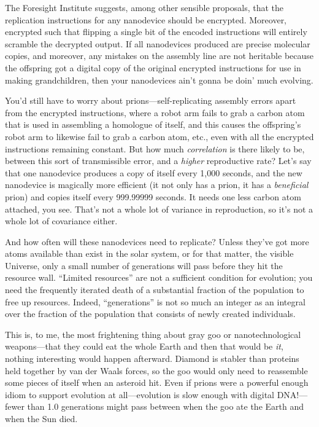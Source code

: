  The Foresight Institute suggests, among other sensible proposals,
that the replication instructions for any nanodevice should be
encrypted. Moreover, encrypted such that flipping a single bit of the
encoded instructions will entirely scramble the decrypted output. If
all nanodevices produced are precise molecular copies, and moreover,
any mistakes on the assembly line are not heritable because the
offspring got a digital copy of the original encrypted instructions for
use in making grandchildren, then your nanodevices
ain't gonna be doin' much evolving.


 You'd still have to worry about
prions---self-replicating assembly errors apart from the encrypted
instructions, where a robot arm fails to grab a carbon atom that is
used in assembling a homologue of itself, and this causes the
offspring's robot arm to likewise fail to grab a carbon
atom, etc., even with all the encrypted instructions remaining
constant. But how much \textit{correlation} is there likely to be,
between this sort of transmissible error, and a \textit{higher}
reproductive rate? Let's say that one nanodevice
produces a copy of itself every 1,000 seconds, and the new nanodevice
is magically more efficient (it not only has a prion, it has a
\textit{beneficial} prion) and copies itself every 999.99999 seconds.
It needs one less carbon atom attached, you see. That's
not a whole lot of variance in reproduction, so it's
not a whole lot of covariance either.


 And how often will these nanodevices need to replicate? Unless
they've got more atoms available than exist in the
solar system, or for that matter, the visible Universe, only a small
number of generations will pass before they hit the resource wall.
``Limited resources'' are not a
sufficient condition for evolution; you need the frequently iterated
death of a substantial fraction of the population to free up resources.
Indeed, ``generations'' is not so
much an integer as an integral over the fraction of the population that
consists of newly created individuals.


 This is, to me, the most frightening thing about gray goo or
nanotechnological weapons---that they could eat the whole Earth and
then that would be \textit{it}, nothing interesting would happen
afterward. Diamond is stabler than proteins held together by van der
Waals forces, so the goo would only need to reassemble some pieces of
itself when an asteroid hit. Even if prions were a powerful enough
idiom to support evolution at all---evolution is slow enough with
digital DNA!---fewer than 1.0 generations might pass between when the
goo ate the Earth and when the Sun died.



